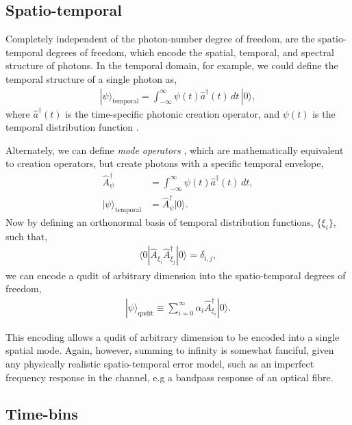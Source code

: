 \documentclass[aps,rmp,twocolumn,amsmath,amssymb,nofootinbib,superscriptaddress,longbibliography,floatfix]{revtex4-1}
\newcommand{\bra}[1]{\langle#1|}
\newcommand{\ket}[1]{|#1\rangle}
\begin{document}
\subsection{Spatio-temporal}

Completely independent of the photon-number degree of freedom, are the spatio-temporal degrees of freedom, which encode the spatial, temporal, and spectral structure of photons. In the temporal domain, for example, we could define the temporal structure of a single photon as,
\begin{align}
\ket\psi_\mathrm{temporal} = \int_{-\infty}^\infty \psi(t) \hat{a}^\dag(t)\,dt\,\ket{0},
\end{align}
where $\hat{a}^\dag(t)$ is the time-specific photonic creation operator, and $\psi(t)$ is the temporal distribution function \cite{bib:RohdeFreqTemp05}.

Alternately, we can define \emph{mode operators} \cite{bib:RohdeMauererSilberhorn07}, which are mathematically equivalent to creation operators, but create photons with a specific temporal envelope,
\begin{align}
\hat{A}^\dag_\psi &= \int_{-\infty}^\infty \psi(t) \hat{a}^\dag(t)\,dt, \nonumber \\
\ket\psi_\mathrm{temporal} &= \hat{A}^\dag_\psi \ket{0}.
\end{align}
Now by defining an orthonormal basis of temporal distribution functions, $\{\xi_i\}$, such that,
\begin{align}
\bra{0} \hat{A}_{\xi_i} \hat{A}^\dag_{\xi_j}\ket{0} = \delta_{i,j},
\end{align}
we can encode a qudit of arbitrary dimension into the spatio-temporal degrees of freedom,
\begin{align}
\ket\psi_\mathrm{qudit} \equiv \sum_{i=0}^\infty \alpha_i \hat{A}^\dag_{\xi_i} \ket{0}.
\end{align}

This encoding allows a qudit of arbitrary dimension to be encoded into a single spatial mode. Again, however, summing to infinity is somewhat fanciful, given any physically realistic spatio-temporal error model, such as an imperfect frequency response in the channel, e.g a bandpass response of an optical fibre.

%
%

\subsection{Time-bins} \label{sec:time_bin}
\end{document}
